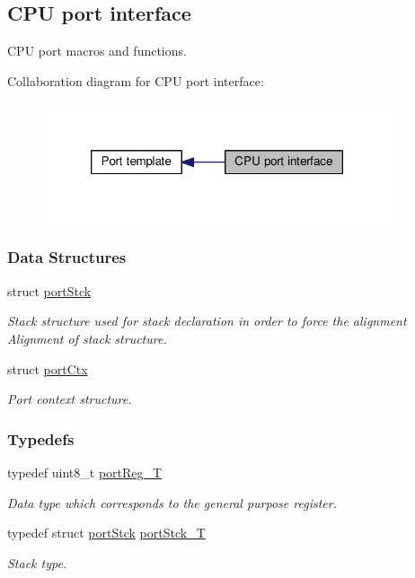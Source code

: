 \hypertarget{group__template__cpu__intf}{\subsection{C\-P\-U port interface}
\label{group__template__cpu__intf}
}


C\-P\-U port macros and functions.  


Collaboration diagram for C\-P\-U port interface\-:\nopagebreak
\begin{figure}[H]
\begin{center}
\leavevmode
\includegraphics[width=290pt]{group__template__cpu__intf}
\end{center}
\end{figure}
\subsubsection*{Data Structures}
\begin{DoxyCompactItemize}
\item 
struct \hyperlink{structportStck}{port\-Stck}
\begin{DoxyCompactList}\small\item\em Stack structure used for stack declaration in order to force the alignment Alignment of stack structure. \end{DoxyCompactList}\item 
struct \hyperlink{structportCtx}{port\-Ctx}
\begin{DoxyCompactList}\small\item\em Port context structure. \end{DoxyCompactList}\end{DoxyCompactItemize}
\subsubsection*{Typedefs}
\begin{DoxyCompactItemize}
\item 
typedef uint8\-\_\-t \hyperlink{group__template__cpu__intf_ga99980ab56ce9857e7380210d12e3d41f}{port\-Reg\-\_\-\-T}
\begin{DoxyCompactList}\small\item\em Data type which corresponds to the general purpose register. \end{DoxyCompactList}\item 
typedef struct \hyperlink{structportStck}{port\-Stck} \hyperlink{group__template__cpu__intf_ga13cc91970e3e05fe4210440c068d3f4a}{port\-Stck\-\_\-\-T}
\begin{DoxyCompactList}\small\item\em Stack type. \end{DoxyCompactList}\end{DoxyCompactItemize}
